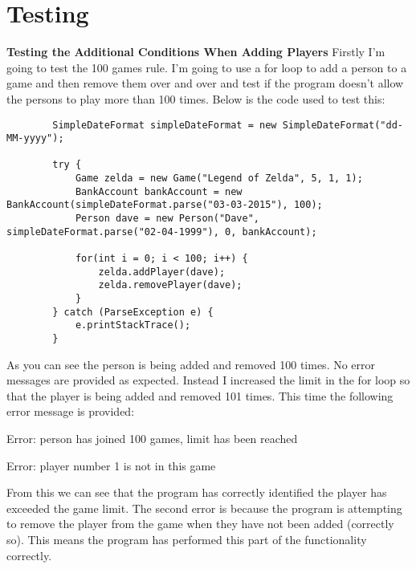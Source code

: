 \documentclass[a4paper]{article}
\begin{document}
\section*{Testing}
\noindent \textbf{Testing the Additional Conditions When Adding Players} \newline
Firstly I'm going to test the 100 games rule. I'm going to use a for loop to add a person to a game and then remove them over and over and test if the program doesn't allow the persons to play more than 100 times. Below is the code used to test this: \begin{lstlisting}
		SimpleDateFormat simpleDateFormat = new SimpleDateFormat("dd-MM-yyyy");

        try {
            Game zelda = new Game("Legend of Zelda", 5, 1, 1);
            BankAccount bankAccount = new BankAccount(simpleDateFormat.parse("03-03-2015"), 100);
            Person dave = new Person("Dave", simpleDateFormat.parse("02-04-1999"), 0, bankAccount);

            for(int i = 0; i < 100; i++) {
                zelda.addPlayer(dave);
                zelda.removePlayer(dave);
            }
        } catch (ParseException e) {
            e.printStackTrace();
        }
\end{lstlisting}
As you can see the person is being added and removed 100 times. No error messages are provided as expected. Instead I increased the limit in the for loop so that the player is being added and removed 101 times. This time the following error message is provided: \newline

\noindent Error: person has joined 100 games, limit has been reached

\noindent Error: player number 1 is not in this game \newline

From this we can see that the program has correctly identified the player has exceeded the game limit. The second error is because the program is attempting to remove the player from the game when they have not been added (correctly so). This means the program has performed this part of the functionality correctly.
\end{document}
